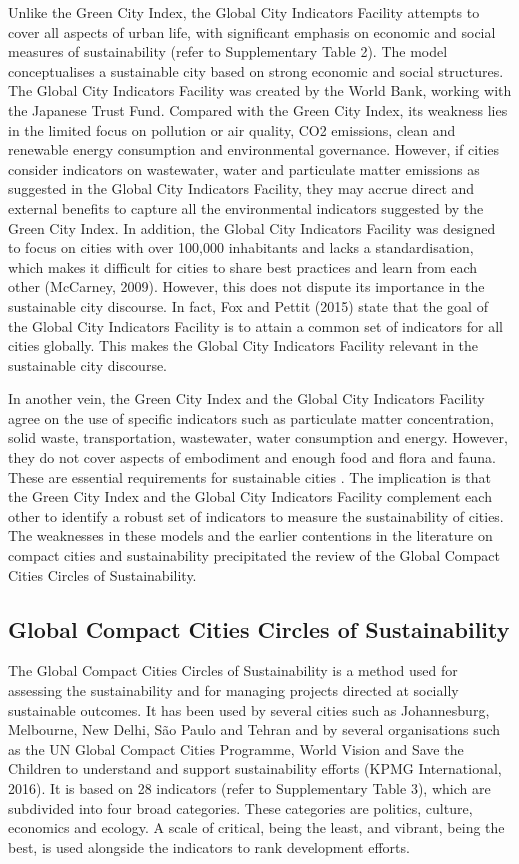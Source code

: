 Unlike the Green City Index, the Global City Indicators Facility attempts to cover all aspects of urban life, with significant emphasis on economic and social measures of sustainability (refer to Supplementary Table 2). The model conceptualises a sustainable city based on strong economic and social structures. The Global City Indicators Facility was created by the World Bank, working with the Japanese Trust Fund. Compared with the Green City Index, its weakness lies in the limited focus on pollution or air quality, CO2 emissions, clean and renewable energy consumption and environmental governance. However, if cities consider indicators on wastewater, water and particulate matter emissions as suggested in the Global City Indicators Facility, they may accrue direct and external benefits to capture all the environmental indicators suggested by the Green City Index. In addition, the Global City Indicators Facility was designed to focus on cities with over 100,000 inhabitants and lacks a standardisation, which makes it difficult for cities to share best practices and learn from each other (McCarney, 2009). However, this does not dispute its importance in the sustainable city discourse. In fact, Fox and Pettit (2015) state that the goal of the Global City Indicators Facility is to attain a common set of indicators for all cities globally. This makes the Global City Indicators Facility relevant in the sustainable city discourse.

In another vein, the Green City Index and the Global City Indicators Facility agree on the use of specific indicators such as particulate matter concentration, solid waste, transportation, wastewater, water consumption and energy. However, they do not cover aspects of embodiment and enough food and flora and fauna. These are essential requirements for sustainable cities \cite{Ackerman2014, Opitz2016, Specht2014}. The implication is that the Green City Index and the Global City Indicators Facility complement each other to identify a robust set of indicators to measure the sustainability of cities. The weaknesses in these models and the earlier contentions in the literature on compact cities and sustainability precipitated the review of the Global Compact Cities Circles of Sustainability.

\subsection{Global Compact Cities Circles of Sustainability}

The Global Compact Cities Circles of Sustainability is a method used for assessing the sustainability and for managing projects directed at socially sustainable outcomes. It has been used by several cities such as Johannesburg, Melbourne, New Delhi, São Paulo and Tehran and by several organisations such as the UN Global Compact Cities Programme, World Vision and Save the Children to understand and support sustainability efforts (KPMG International, 2016). It is based on 28 indicators (refer to Supplementary Table 3), which are subdivided into four broad categories. These categories are politics, culture, economics and ecology. A scale of critical, being the least, and vibrant, being the best, is used alongside the indicators to rank development efforts.


